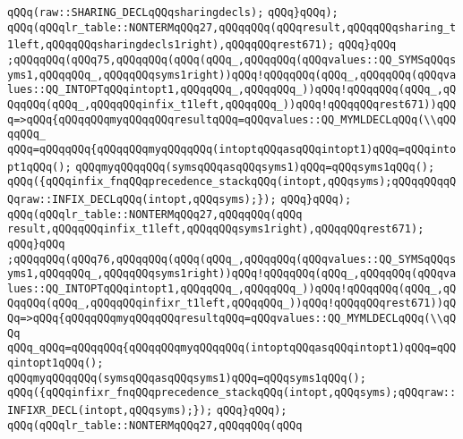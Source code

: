 \verb|qQQq(raw::SHARING_DECLqQQqsharingdecls);|\newline
\verb|qQQq}qQQq);|\newline
\verb|qQQq(qQQqlr_table::NONTERMqQQq27,qQQqqQQq(qQQqresult,qQQqqQQqsharing_t1left,qQQqqQQqsharingdecls1right),qQQqqQQqrest671);|\newline
\verb|qQQq}qQQq|\newline
\verb|;qQQqqQQq(qQQq75,qQQqqQQq(qQQq(qQQq_,qQQqqQQq(qQQqvalues::QQ_SYMSqQQqsyms1,qQQqqQQq_,qQQqqQQqsyms1right))qQQq!qQQqqQQq(qQQq_,qQQqqQQq(qQQqvalues::QQ_INTOPTqQQqintopt1,qQQqqQQq_,qQQqqQQq_))qQQq!qQQqqQQq(qQQq_,qQQqqQQq(qQQq_,qQQqqQQqinfix_t1left,qQQqqQQq_))qQQq!qQQqqQQqrest671))qQQq=>qQQq{qQQqqQQqmyqQQqqQQqresultqQQq=qQQqvalues::QQ_MYMLDECLqQQq(\\qQQqqQQq_|\newline
\verb|qQQq=qQQqqQQq{qQQqqQQqmyqQQqqQQq(intoptqQQqasqQQqintopt1)qQQq=qQQqintopt1qQQq();|\newline
\verb|qQQqmyqQQqqQQq(symsqQQqasqQQqsyms1)qQQq=qQQqsyms1qQQq();|\newline
\verb|qQQq({qQQqinfix_fnqQQqprecedence_stackqQQq(intopt,qQQqsyms);qQQqqQQqqQQqraw::INFIX_DECLqQQq(intopt,qQQqsyms);});|\newline
\verb|qQQq}qQQq);|\newline
\verb|qQQq(qQQqlr_table::NONTERMqQQq27,qQQqqQQq(qQQq|\newline
\verb|result,qQQqqQQqinfix_t1left,qQQqqQQqsyms1right),qQQqqQQqrest671);|\newline
\verb|qQQq}qQQq|\newline
\verb|;qQQqqQQq(qQQq76,qQQqqQQq(qQQq(qQQq_,qQQqqQQq(qQQqvalues::QQ_SYMSqQQqsyms1,qQQqqQQq_,qQQqqQQqsyms1right))qQQq!qQQqqQQq(qQQq_,qQQqqQQq(qQQqvalues::QQ_INTOPTqQQqintopt1,qQQqqQQq_,qQQqqQQq_))qQQq!qQQqqQQq(qQQq_,qQQqqQQq(qQQq_,qQQqqQQqinfixr_t1left,qQQqqQQq_))qQQq!qQQqqQQqrest671))qQQq=>qQQq{qQQqqQQqmyqQQqqQQqresultqQQq=qQQqvalues::QQ_MYMLDECLqQQq(\\qQQq|\newline
\verb|qQQq_qQQq=qQQqqQQq{qQQqqQQqmyqQQqqQQq(intoptqQQqasqQQqintopt1)qQQq=qQQqintopt1qQQq();|\newline
\verb|qQQqmyqQQqqQQq(symsqQQqasqQQqsyms1)qQQq=qQQqsyms1qQQq();|\newline
\verb|qQQq({qQQqinfixr_fnqQQqprecedence_stackqQQq(intopt,qQQqsyms);qQQqraw::INFIXR_DECL(intopt,qQQqsyms);});|\newline
\verb|qQQq}qQQq);|\newline
\verb|qQQq(qQQqlr_table::NONTERMqQQq27,qQQqqQQq(qQQq|\newline
